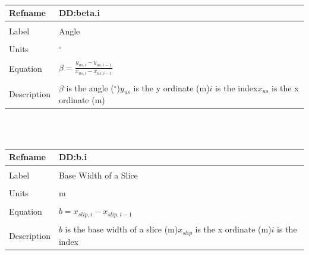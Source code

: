 \documentclass[12pt]{article}
\begin{document}
~\newline
\noindent \begin{minipage}{\textwidth}
\begin{tabular}{p{} p{}}
\toprule \textbf{Refname} & \textbf{DD:beta.i}
\label{DD:beta.i}
\\ \midrule \\
Label & Angle
\\ \midrule \\
Units & ${}^{\circ}$
\\ \midrule \\
Equation & $β=\frac{{y_{us,i}}-{y_{us,i-1}}}{{x_{us,i}}-{x_{us,i-1}}}$
\\ \midrule \\
Description & $β$ is the angle (${}^{\circ}$)\newline${y_{us}}$ is the y ordinate (m)\newline$i$ is the index\newline${x_{us}}$ is the x ordinate (m)
\\ \bottomrule \end{tabular}
\end{minipage}\\
~\newline
\noindent \begin{minipage}{\textwidth}
\begin{tabular}{p{} p{}}
\toprule \textbf{Refname} & \textbf{DD:b.i}
\label{DD:b.i}
\\ \midrule \\
Label & Base Width of a Slice
\\ \midrule \\
Units & m
\\ \midrule \\
Equation & $b={x_{slip,i}}-{x_{slip,i-1}}$
\\ \midrule \\
Description & $b$ is the base width of a slice (m)\newline${x_{slip}}$ is the x ordinate (m)\newline$i$ is the index
\\ \bottomrule \end{tabular}
\end{minipage}\\
~\newline
\end{document}
